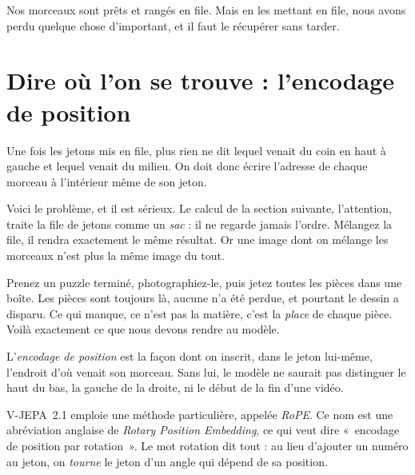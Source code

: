 Nos morceaux sont prêts et rangés en file. Mais en les mettant en file, nous
avons perdu quelque chose d'important, et il faut le récupérer sans tarder.

\section{Dire où l'on se trouve : l'encodage de position}

\begin{enclair}
Une fois les jetons mis en file, plus rien ne dit lequel venait du coin en
haut à gauche et lequel venait du milieu. On doit donc écrire l'adresse de
chaque morceau à l'intérieur même de son jeton.
\end{enclair}

Voici le problème, et il est sérieux. Le calcul de la section suivante,
l'attention, traite la file de jetons comme un \emph{sac} : il ne regarde
jamais l'ordre. Mélangez la file, il rendra exactement le même résultat. Or
une image dont on mélange les morceaux n'est plus la même image du tout.

\begin{intuition}
Prenez un puzzle terminé, photographiez-le, puis jetez toutes les pièces
dans une boîte. Les pièces sont toujours là, aucune n'a été perdue, et
pourtant le dessin a disparu. Ce qui manque, ce n'est pas la matière, c'est
la \emph{place} de chaque pièce. Voilà exactement ce que nous devons rendre
au modèle.
\end{intuition}

\begin{definition}
L'\emph{encodage de position} est la façon dont on inscrit, dans le jeton
lui-même, l'endroit d'où venait son morceau. Sans lui, le modèle ne saurait
pas distinguer le haut du bas, la gauche de la droite, ni le début de la fin
d'une vidéo.
\end{definition}

V-JEPA~2.1 emploie une méthode particulière, appelée \emph{RoPE}. Ce nom est
une abréviation anglaise de \emph{Rotary Position Embedding}, ce qui veut
dire «~encodage de position par rotation~». Le mot rotation dit tout : au
lieu d'ajouter un numéro au jeton, on \emph{tourne} le jeton d'un angle qui
dépend de sa position.

